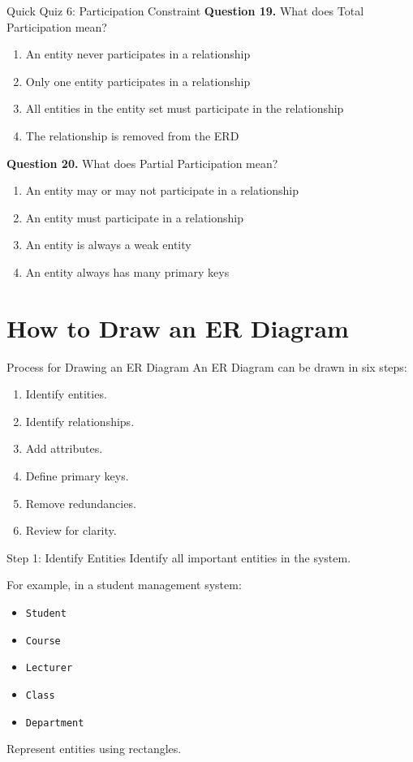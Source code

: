 \documentclass[aspectratio=169,11pt]{beamer}
\newcommand{\tightlist}{\setlength{\itemsep}{2pt}\setlength{\parskip}{0pt}}
\newcommand{\smallitem}{\setlength{\itemsep}{2pt}\setlength{\parskip}{0pt}}
\newcommand{\qoption}[2]{\item[#1.] #2}
\begin{document}
\begin{frame}{Quick Quiz 6: Participation Constraint}
\small
\textbf{Question 19.} What does Total Participation mean?
\begin{enumerate}
\tightlist
  \qoption{A}{An entity never participates in a relationship}
  \qoption{B}{Only one entity participates in a relationship}
  \qoption{C}{All entities in the entity set must participate in the relationship}
  \qoption{D}{The relationship is removed from the ERD}
\end{enumerate}

\textbf{Question 20.} What does Partial Participation mean?
\begin{enumerate}
\tightlist
  \qoption{A}{An entity may or may not participate in a relationship}
  \qoption{B}{An entity must participate in a relationship}
  \qoption{C}{An entity is always a weak entity}
  \qoption{D}{An entity always has many primary keys}
\end{enumerate}
\end{frame}

\section{How to Draw an ER Diagram}

\begin{frame}{Process for Drawing an ER Diagram}
\small
An ER Diagram can be drawn in six steps:
\begin{enumerate}
\smallitem
  \item Identify entities.
  \item Identify relationships.
  \item Add attributes.
  \item Define primary keys.
  \item Remove redundancies.
  \item Review for clarity.
\end{enumerate}
\end{frame}

\begin{frame}{Step 1: Identify Entities}
\small
Identify all important entities in the system.

\vspace{2mm}
For example, in a student management system:
\begin{itemize}
\smallitem
  \item \texttt{Student}
  \item \texttt{Course}
  \item \texttt{Lecturer}
  \item \texttt{Class}
  \item \texttt{Department}
\end{itemize}

Represent entities using rectangles.
\end{frame}
\end{document}
